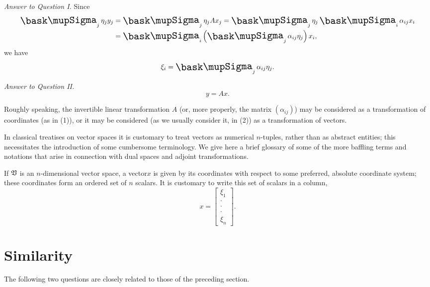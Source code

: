 \smallskip

\emph{Answer to Question I.} Since
\begin{align*}
    \sumx_j \eta_j y_j &= \sumx_j \eta_j Ax_j = \sumx_j \eta_j \sumx_i \alpha_{ij}x_i\\
    &= \sumx_i \left(\sumx_j \alpha_{ij} \eta_j\right) x_i,
\end{align*}
we have
\begin{equation}
    \xi_i = \sumx_j \alpha_{ij} \eta_j.
\end{equation}

\smallskip

\emph{Answer to Question II.}
\begin{equation}
    y = Ax.
\end{equation}

\smallskip

Roughly speaking, the invertible linear transformation \(A\) (or, more properly,
the matrix \((\alpha_{ij})\)) may be considered as a transformation of
coordinates (as in (1)), or it may be considered (as we usually consider it, in
(2)) as a transformation of vectors.

In classical treatises on vector spaces it is customary to treat vectors as
numerical \(n\)-tuples, rather than as abstract entities; this necessitates the
introduction of some cumbersome terminology. We give here a brief glossary of
some of the more baffling terms and notations that arise in connection with dual
spaces and adjoint transformations.

If \(\mathfrak{V}\) is an \(n\)-dimensional vector space, a vector\(x\) is given by
its coordinates with respect to some preferred, absolute coordinate system;
these coordinates form an ordered set of \(n\) scalars. It is customary to write
this set of scalars in a column,
\begin{equation*}
    x = \begin{bmatrix}
        \xi_1 \\
        \cdot \\
        \cdot \\
        \cdot \\
        \xi_n
    \end{bmatrix}.
\end{equation*}

\section{Similarity}

The following two questions are closely related to those of the preceding
section.

